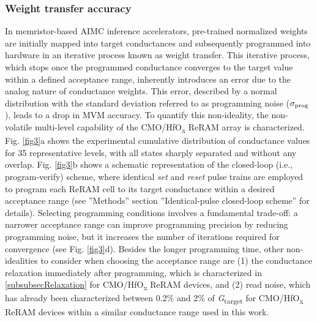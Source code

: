 \subsubsection{Weight transfer accuracy}\label{subsubsecMultibit}
In memristor-based AIMC inference accelerators, pre-trained normalized weights are initially mapped into target conductances and subsequently programmed into hardware in an iterative process known as weight transfer. This iterative process, which stops once the programmed conductance converges to the target value within a defined acceptance range, inherently introduces an error due to the analog nature of conductance weights. This error, described by a normal distribution with the standard deviation referred to as programming noise ($\sigma_{\rm prog}$), leads to a drop in MVM accuracy. To quantify this non-ideality, the non-volatile multi-level capability of the CMO/HfO\textsubscript{\textnormal{x}} ReRAM array is characterized. Fig. \ref{fig3}a shows the experimental cumulative distribution of conductance values for 35 representative levels, with all states sharply separated and without any overlap. Fig. \ref{fig3}b shows a schematic representation of the closed-loop (i.e., program-verify) scheme, where identical \textit{set} and \textit{reset} pulse trains are employed to program each ReRAM cell to its target conductance within a desired acceptance range (see ”Methods” section ”Identical-pulse closed-loop scheme” for details). Selecting programming conditions involves a fundamental trade-off: a narrower acceptance range can improve programming precision by reducing programming noise, but it increases the number of iterations required for convergence (see Fig. \ref{fig3}d). Besides the longer programming time, other non-idealities to consider when choosing the acceptance range are (1) the conductance relaxation immediately after programming, which is characterized in \ref{subsubsecRelaxation} for CMO/HfO\textsubscript{\textnormal{x}} ReRAM devices, and (2) read noise, which has already been characterized between 0.2\% and 2\% of \textit{G}\textsubscript{\textnormal{target}} for CMO/HfO\textsubscript{\textnormal{x}} ReRAM devices \cite{Davide_DRC} within a similar conductance range used in this work. 
\\
\\
